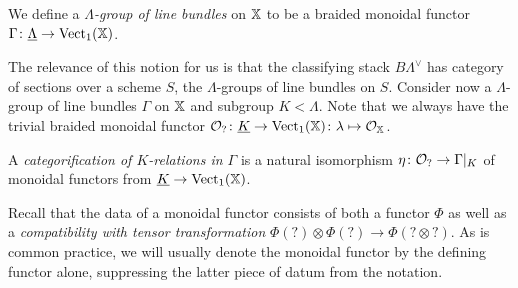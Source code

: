 \documentclass[12pt]{amsart}
\begin{document}
\begin{definition} \label{def:groupline}
We define a {\em $\Lambda$-group of line bundles} on $\mathbb{X}$ to be a braided monoidal functor $\Gamma \colon \underline{\Lambda} \rightarrow \operatorname{Vect}_1(\mathbb{X})$.
\end{definition}
The relevance of this notion for us is that the classifying stack $B\Lambda^{\vee}$ has category of sections over a scheme $S$, the $\Lambda$-groups of line bundles on $S$. Consider now a $\Lambda$-group of line bundles $\Gamma$ on $\mathbb{X}$ and subgroup $K < \Lambda$. Note that we always have the trivial braided monoidal functor $\mathcal{O}_? \colon \underline{K} \to \operatorname{Vect}_1(\mathbb{X}) \colon \lambda \mapsto \mathcal{O}_{\mathbb{X}}$. 
\begin{definition}   \label{def:categorifyrel}
A {\em categorification of $K$-relations in $\Gamma$} is a natural isomorphism $\eta \colon \mathcal{O}_? \to \Gamma |_K$ of monoidal functors from $\underline{K} \to \operatorname{Vect}_1(\mathbb{X})$. 
\end{definition}

Recall that the data of a monoidal functor consists of both a functor $\Phi$ as well as a {\em compatibility with tensor transformation} $\Phi(?) \otimes \Phi(?) \to \Phi(? \otimes ?)$. As is common practice, we will usually denote the monoidal functor by the defining functor alone, suppressing the latter piece of datum from the notation. 
\end{document}
